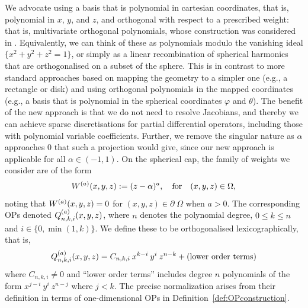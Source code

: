 \documentclass[11pt, oneside]{article}   	%
\begin{document}
We advocate using a basis that is polynomial in cartesian coordinates, that is, polynomial in $x$, $y$, and $z$, and orthogonal with respect to a prescribed weight: that is, multivariate orthogonal polynomials, whose construction was considered in \cite{olver2020orthogonal}. Equivalently, we can think of these as polynomials modulo the vanishing ideal $\{ x^2 + y^2 + z^2 = 1 \}$, or simply as a linear recombination of spherical harmonics that are orthogonalised on a subset of the sphere. This is in contrast to more standard approaches based on mapping the geometry to a simpler one (e.g., a rectangle or disk) and using orthogonal polynomials in the mapped coordinates (e.g., a basis that is polynomial in the spherical coordinates $\varphi$ and $\theta$). The benefit of the new approach is that we do not need to resolve Jacobians, and thereby we can achieve sparse discretisations for partial differential operators, including those with polynomial variable coefficients. Further, we remove the singular nature as $\alpha$ approaches $0$ that such a projection would give, since our new approach is applicable for all $\alpha \in (-1,1)$. On the spherical cap, the family of weights we consider are of the form
\begin{align*}
	W^{(a)}(x,y,z) := (z - \alpha)^a, \quad\hbox{for}\quad (x,y,z) \in \Omega,
\end{align*}
noting that $W^{(a)}(x,y,z) = 0$ for $(x,y,z) \in \partial \; \Omega$ when $a > 0$. The corresponding OPs denoted $Q_{n,k,i}^{(a)}(x,y,z)$, where $n$ denotes the polynomial degree, $0 \le k \le n$ and $i \in \{0, \min(1,k)\}$. We define these to be orthogonalised lexicographically, that is,
\begin{align*}
	Q_{n,k,i}^{(a)}(x,y,z) = C_{n,k,i} \: x^{k-i} \: y^i \: z^{n-k} + (\hbox{lower order terms})
\end{align*}
where $C_{n,k,i} \neq 0$ and \enquote{lower order terms} includes degree $n$ polynomials of the form $x^{j - i} \: y^{i} \: z^{n-j}$ where $j < k$. The precise normalization arises from their definition in terms of one-dimensional OPs in Definition~\ref{def:OPconstruction}. 
\end{document}
